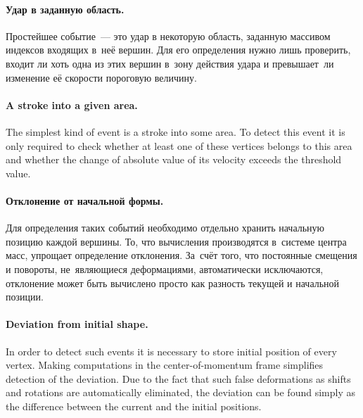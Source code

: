 \documentclass[a4paper, 12pt, titlepage]{extarticle}
\begin{document}
\begin{original}
        \paragraph{Удар в заданную область.}
        Простейшее событие~--- это удар в некоторую область, заданную массивом индексов
        входящих в~неё вершин. Для его определения нужно лишь проверить, входит ли хоть одна из этих
        вершин в~зону действия удара и превышает~ли изменение её скорости пороговую величину.
\end{original}

        \paragraph{A stroke into a given area.}
        The simplest kind of event is a stroke into some area. To detect this event it is only
        required to check whether at least one of these vertices belongs to this area and whether
        the change of absolute value of its velocity exceeds the threshold value.

\begin{original}
        \paragraph{Отклонение от начальной формы.}
        Для определения таких событий необходимо отдельно хранить начальную позицию каждой вершины.
        То, что вычисления производятся в~системе центра масс, упрощает определение
        отклонения. За~счёт того, что постоянные смещения и повороты, не~являющиеся деформациями,
        автоматически исключаются, отклонение может быть вычислено просто как разность текущей и
        начальной позиции.
\end{original}

        \paragraph{Deviation from initial shape.}
        In order to detect such events it is necessary to store initial position of every vertex.
        Making computations in the center-of-momentum frame simplifies detection of the deviation.
        Due to the fact that such false deformations as shifts and rotations are automatically
        eliminated, the deviation can be found simply as the difference between the current and the
        initial positions.
\end{document}
